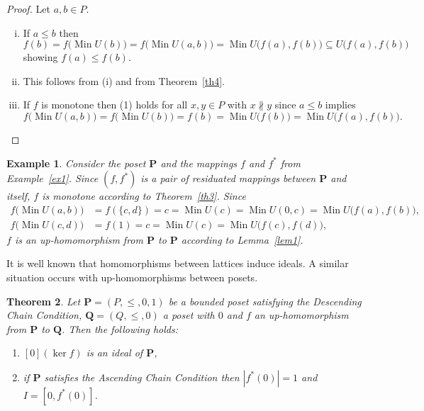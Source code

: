 \documentclass[12pt]{article}
\DeclareMathOperator{\Min}{Min}
\newtheorem{theorem}{Theorem}[section]
\newtheorem{example}[theorem]{Example}
\begin{document}
\begin{proof}
Let $a,b\in P$.
\begin{enumerate}[(i)]
\item If $a\le b$ then
\[
f(b)=f\big(\Min U(b)\big)=f\big(\Min U(a,b)\big)=\Min U\big(f(a),f(b)\big)\subseteq U\big(f(a),f(b)\big)
\]
showing $f(a)\le f(b)$.
\item This follows from (i) and from Theorem~\ref{th4}.
\item If $f$ is monotone then (1) holds for all $x,y\in P$ with $x\not\parallel y$ since $a\le b$ implies
\[
f\big(\Min U(a,b)\big)=f\big(\Min U(b)\big)=f(b)=\Min U\big(f(b)\big)=\Min U\big(f(a),f(b)\big).
\]
\end{enumerate}		
\end{proof}

\begin{example}
Consider the poset $\mathbf P$ and the mappings $f$ and $f^*$ from Example~\ref{ex1}. Since $(f,f^*)$ is a pair of residuated mappings between $\mathbf P$ and itself, $f$ is monotone according to Theorem~\ref{th3}. Since
\begin{align*}
f\big(\Min U(a,b)\big) & =f(\{c,d\})=c=\Min U(c)=\Min U(0,c)=\Min U\big(f(a),f(b)\big), \\
f\big(\Min U(c,d)\big) & =f(1)=c=\Min U(c)=\Min U\big(f(c),f(d)\big),
\end{align*}
$f$ is an up-homomorphism from $\mathbf P$ to $\mathbf P$ according to Lemma~\ref{lem1}.
\end{example}

It is well known that homomorphisms between lattices induce ideals. A similar situation occurs with up-homomorphisms between posets.

\begin{theorem}
Let $\mathbf P=(P,\le,0,1)$ be a bounded poset satisfying the Descending Chain Condition, $\mathbf Q=(Q,\le,0)$ a poset with $0$ and $f$ an up-homomorphism from $\mathbf P$ to $\mathbf Q$. Then the following holds:
\begin{enumerate}[{\rm(i)}]
\item $[0](\ker f)$ is an ideal of $\mathbf P$,
\item if $\mathbf P$ satisfies the Ascending Chain Condition then $|f^*(0)|=1$ and $I=[0,f^*(0)]$.
\end{enumerate}
\end{theorem}
\end{document}
